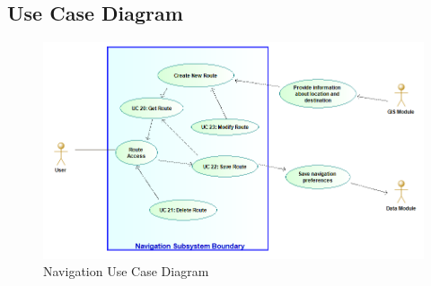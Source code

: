 	\subsection{Use Case Diagram}
	\begin{figure}[H]
	\includegraphics[width=\linewidth]{Navigation/NavigationModuleUseCaseDiagram.png}
	\caption{Navigation Use Case Diagram}
	\label{fig:UML4}
	\end{figure}
	
	


	
	
	


